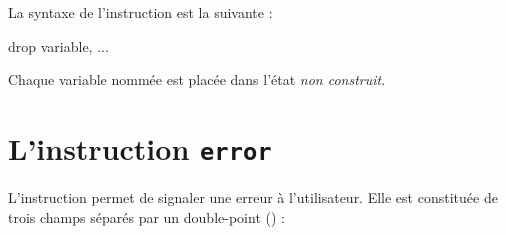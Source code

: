 La syntaxe de l'instruction  est la suivante :
{
\begin{galgascode}
drop variable, ...
\end{galgascode}
}

Chaque variable nommée est placée dans l'état \emph{non construit}.








\section{L'instruction \texttt{error}}

L'instruction  permet de signaler une erreur à l'utilisateur. Elle est constituée de trois champs séparés par un double-point (\galgas{\:}) :

